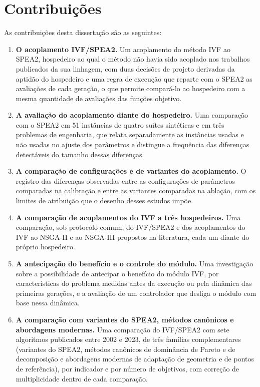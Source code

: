 \section{Contribuições}
\label{sec:contribuicoes}

As contribuições desta dissertação são as seguintes:

\begin{enumerate}
    \item \textbf{O acoplamento IVF/SPEA2.} Um acoplamento do método IVF ao SPEA2, hospedeiro ao qual o método não havia sido acoplado nos trabalhos publicados da sua linhagem, com duas decisões de projeto derivadas da aptidão do hospedeiro e uma regra de execução que reparte com o SPEA2 as avaliações de cada geração, o que permite compará-lo ao hospedeiro com a mesma quantidade de avaliações das funções objetivo.

    \item \textbf{A avaliação do acoplamento diante do hospedeiro.} Uma comparação com o SPEA2 em 51 instâncias de quatro suítes sintéticas e em três problemas de engenharia, que relata separadamente as instâncias usadas e não usadas no ajuste dos parâmetros e distingue a frequência das diferenças detectáveis do tamanho dessas diferenças.

    \item \textbf{A comparação de configurações e de variantes do acoplamento.} O registro das diferenças observadas entre as configurações de parâmetros comparadas na calibração e entre as variantes comparadas na ablação, com os limites de atribuição que o desenho desses estudos impõe.

    \item \textbf{A comparação de acoplamentos do IVF a três hospedeiros.} Uma comparação, sob protocolo comum, do IVF/SPEA2 e dos acoplamentos do IVF ao NSGA-II e ao NSGA-III propostos na literatura, cada um diante do próprio hospedeiro.

    \item \textbf{A antecipação do benefício e o controle do módulo.} Uma investigação sobre a possibilidade de antecipar o benefício do módulo IVF, por características do problema medidas antes da execução ou pela dinâmica das primeiras gerações, e a avaliação de um controlador que desliga o módulo com base nessa dinâmica.

    \item \textbf{A comparação com variantes do SPEA2, métodos canônicos e abordagens modernas.} Uma comparação do IVF/SPEA2 com sete algoritmos publicados entre 2002 e 2023, de três famílias complementares (variantes do SPEA2, métodos canônicos de dominância de Pareto e de decomposição e abordagens modernas de adaptação de geometria e de pontos de referência), por indicador e por número de objetivos, com correção de multiplicidade dentro de cada comparação.
\end{enumerate}

